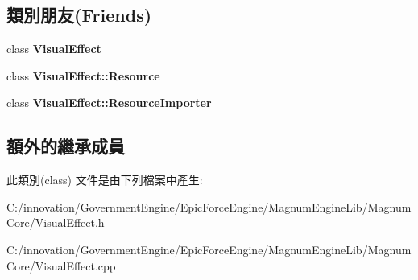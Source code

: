 \subsection*{類別朋友(Friends)}
\begin{DoxyCompactItemize}
\item 
class {\bfseries Visual\+Effect}\hypertarget{class_i_dream_sky_1_1_visual_effect_1_1_resource_ad19546ee8a8868c73e6f88564fb88462}{}\label{class_i_dream_sky_1_1_visual_effect_1_1_resource_ad19546ee8a8868c73e6f88564fb88462}

\item 
class {\bfseries Visual\+Effect\+::\+Resource}\hypertarget{class_i_dream_sky_1_1_visual_effect_1_1_resource_a7e5f0c0359cb7300a876070f845cb939}{}\label{class_i_dream_sky_1_1_visual_effect_1_1_resource_a7e5f0c0359cb7300a876070f845cb939}

\item 
class {\bfseries Visual\+Effect\+::\+Resource\+Importer}\hypertarget{class_i_dream_sky_1_1_visual_effect_1_1_resource_a316a2d14e00fb787148dd7c1f760c78c}{}\label{class_i_dream_sky_1_1_visual_effect_1_1_resource_a316a2d14e00fb787148dd7c1f760c78c}

\end{DoxyCompactItemize}
\subsection*{額外的繼承成員}


此類別(class) 文件是由下列檔案中產生\+:\begin{DoxyCompactItemize}
\item 
C\+:/innovation/\+Government\+Engine/\+Epic\+Force\+Engine/\+Magnum\+Engine\+Lib/\+Magnum\+Core/Visual\+Effect.\+h\item 
C\+:/innovation/\+Government\+Engine/\+Epic\+Force\+Engine/\+Magnum\+Engine\+Lib/\+Magnum\+Core/Visual\+Effect.\+cpp\end{DoxyCompactItemize}
